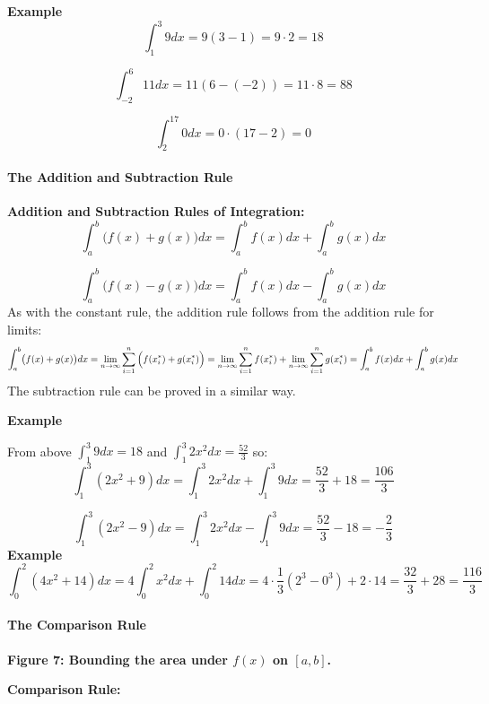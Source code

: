 \textbf{Example}
$$
\int_1^3 9 dx = 9(3-1) = 9 \cdot 2 = 18
$$



$$
\int_{-2}^6 11 dx = 11(6 - (-2)) = 11 \cdot 8 = 88
$$



$$
\int_2^{17} 0 dx = 0 \cdot (17-2) = 0
$$
\paragraph{The Addition and Subtraction Rule}



\textbf{Addition and Subtraction Rules of Integration:}
$$
\int_a^b \bigl(f(x) + g(x)\bigr) dx = \int_a^b f(x) dx + \int_a^b g(x) dx
$$



$$
\int_a^b \bigl(f(x) - g(x)\bigr) dx = \int_a^b f(x) dx - \int_a^b g(x) dx
$$
As with the constant rule, the addition rule follows from the addition rule for limits:
$$
\int_a^b \bigl(f(x) + g(x)\bigr) dx = \lim_{n \to \infty} \sum_{i=1}^n \Big(f(x_i^*) + g(x_{i}^\ast)\Big) \\ = \lim_{n \to \infty} \sum_{i=1}^n f(x_{i}^\ast) + \lim_{n \to \infty} \sum_{i=1}^n g(x_{i}^\ast) \\ = \int_a^b f(x) dx + \int_a^b g(x) dx
$$
The subtraction rule can be proved in a similar way.



\textbf{Example}



From above $\int_1^3 9 dx = 18$ and $\int_1^3 2x^2 dx = \frac{52}{3}$ so:
$$
\int_1^3 (2x^2 + 9) dx = \int_1^3 2x^2 dx + \int_1^3 9 dx = \frac{52}{3} + 18 = \frac{106}{3}
$$



$$
\int_1^3 (2x^2 - 9) dx = \int_1^3 2x^2 dx - \int_1^3 9 dx = \frac{52}{3} - 18 = -\frac{2}{3}
$$
\textbf{Example}
$$
\int_0^2 (4x^2 + 14) dx = 4 \int_0^2 x^2 dx + \int_0^2 14 dx = 4 \cdot \frac{1}{3}(2^3 - 0^3) + 2 \cdot 14 = \frac{32}{3} + 28 = \frac{116}{3}
$$
\paragraph{The Comparison Rule}




\textbf{Figure 7: Bounding the area under $f(x)$ on $[a,b]$.}



\textbf{Comparison Rule:}



